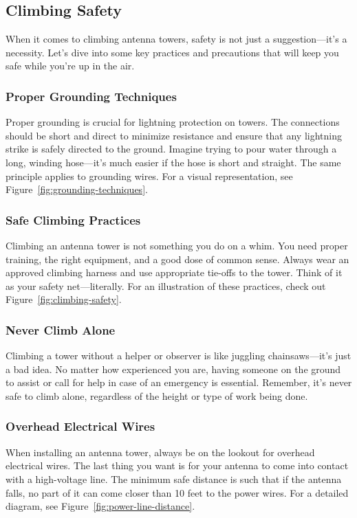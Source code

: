\subsection{Climbing Safety}
\label{subsec:climb-safety2}

When it comes to climbing antenna towers, safety is not just a suggestion—it's a necessity. Let's dive into some key practices and precautions that will keep you safe while you're up in the air.

\subsubsection*{Proper Grounding Techniques}
Proper grounding is crucial for lightning protection on towers. The connections should be short and direct to minimize resistance and ensure that any lightning strike is safely directed to the ground. Imagine trying to pour water through a long, winding hose—it’s much easier if the hose is short and straight. The same principle applies to grounding wires. For a visual representation, see Figure~\ref{fig:grounding-techniques}.

\subsubsection*{Safe Climbing Practices}
Climbing an antenna tower is not something you do on a whim. You need proper training, the right equipment, and a good dose of common sense. Always wear an approved climbing harness and use appropriate tie-offs to the tower. Think of it as your safety net—literally. For an illustration of these practices, check out Figure~\ref{fig:climbing-safety}.

\subsubsection*{Never Climb Alone}
Climbing a tower without a helper or observer is like juggling chainsaws—it’s just a bad idea. No matter how experienced you are, having someone on the ground to assist or call for help in case of an emergency is essential. Remember, it’s never safe to climb alone, regardless of the height or type of work being done.

\subsubsection*{Overhead Electrical Wires}
When installing an antenna tower, always be on the lookout for overhead electrical wires. The last thing you want is for your antenna to come into contact with a high-voltage line. The minimum safe distance is such that if the antenna falls, no part of it can come closer than 10 feet to the power wires. For a detailed diagram, see Figure~\ref{fig:power-line-distance}.

